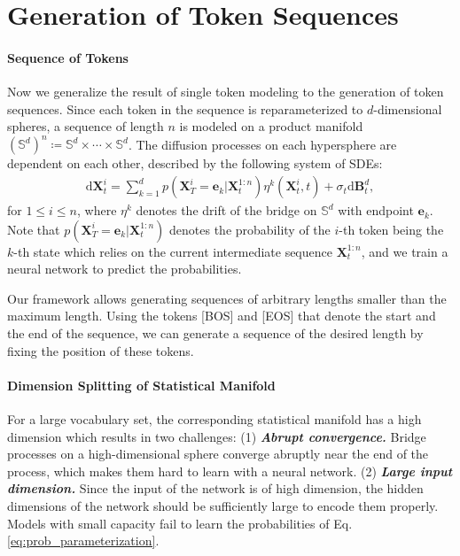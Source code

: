 \section{Generation of Token Sequences \label{sec:sequence}}

\paragraph{Sequence of Tokens}
Now we generalize the result of single token modeling to the generation of token sequences.
Since each token in the sequence is reparameterized to $d$-dimensional spheres, a sequence of length $n$ is modeled on a product manifold $(\mathbb{S}^d)^{n}\coloneqq \mathbb{S}^d\times\cdots\times\mathbb{S}^d$.
The diffusion processes on each hypersphere are dependent on each other, described by the following system of SDEs: 
\begin{align}
    \mathrm{d}\bm{X}^{i}_t =\! \sum^{d}_{k=1} p(\bm{X}^{i}_T \!=\! \bm{e}_k | \bm{X}^{1:n}_t) \eta^{k}(\bm{X}^{i}_t, t) + \sigma_t\mathrm{d}\mathbf{B}^{d}_t,
\end{align}
for $1\leq i\leq n$, where $\eta^k$ denotes the drift of the bridge on $\mathbb{S}^d$ with endpoint $\bm{e}_k$. 
Note that $p(\bm{X}^{i}_T=\bm{e}_k|\bm{X}^{1:n}_t)$ denotes the probability of the $i$-th token being the $k$-th state which relies on the current intermediate sequence $\bm{X}^{1:n}_t$, and we train a neural network to predict the probabilities.


Our framework allows generating sequences of arbitrary lengths smaller than the maximum length. Using the tokens [BOS] and [EOS] that denote the start and the end of the sequence, we can generate a sequence of the desired length by fixing the position of these tokens.


\paragraph{Dimension Splitting of Statistical Manifold} \label{method:splitting}
For a large vocabulary set, the corresponding statistical manifold has a high dimension which results in two challenges: 
(1) \textbf{\textit{Abrupt convergence.}} Bridge processes on a high-dimensional sphere converge abruptly near the end of the process, which makes them hard to learn with a neural network.
(2) \textbf{\textit{Large input dimension.}} Since the input of the network is of high dimension, the hidden dimensions of the network should be sufficiently large to encode them properly. Models with small capacity fail to learn the probabilities of Eq.\eqref{eq:prob_parameterization}.



